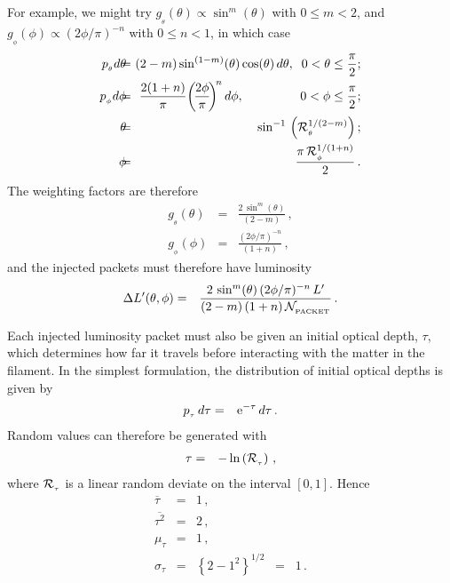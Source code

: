 \documentclass[usenatbib]{mn2e}
\numberwithin{equation}{section}
\begin{document}
For example, we might try $g_{_\theta}(\theta)\!\propto\!\sin^m(\theta)$ with $0\!\leq\!m\!<\!2$, and $g_{_\phi}(\phi)\!\propto\!(2\phi /\pi)^{-n}$ with $0\!\leq\!n\!<\!1$, in which case
\begin{eqnarray}
p_{_\theta}d\theta\!\!&\!\!=\!\!&\!\!(2-m)\sin^{(1-m)}(\theta)\cos(\theta)\,d\theta,\;\;0<\theta\leq\frac{\pi}{2};\\
p_{_\phi}d\phi\!\!&\!\!=\!\!&\!\!\frac{2(1+n)}{\pi}\!\left(\!\frac{2\phi}{\pi}\!\right)^{\!n}d\phi,\hspace{1.60cm}0<\phi\leq\frac{\pi}{2};\\
\theta\!\!&\!\!=\!\!&\!\!\sin^{-1}\,\left({\cal R}_{_\theta}^{1/(2-m)}\right);\\
\phi\!\!&\!\!=\!\!&\!\!\frac{\pi\,{\cal R}_{_\phi}^{1/(1+n)}}{2}\,.
\end{eqnarray}
The weighting factors are therefore
\begin{eqnarray}
g_{_\theta}(\theta)&=&\frac{2\,\sin^m(\theta)}{(2-m)}\,,\\
g_{_\phi}(\phi)&=&\frac{(2\phi /\pi)^{-n}}{(1+n)}\,,
\end{eqnarray}
and the injected packets must therefore have luminosity
\begin{eqnarray}
\Delta L'(\theta,\phi)&=&\frac{2\,\sin^m(\theta)\,(2\phi /\pi)^{-n}\,L'}{(2-m)\,(1+n)\,{\cal N}_{_{\rm PACKET}}}\,.
\end{eqnarray}

Each injected luminosity packet must also be given an initial optical depth, $\tau$, which determines how far it travels before interacting with the matter in the filament. In the simplest formulation, the distribution of initial optical depths is given by
\begin{eqnarray}
p_{_\tau}\,d\tau&=&{\rm e}^{-\tau}\,d\tau\,.
\end{eqnarray}
Random values can therefore be generated with
\begin{eqnarray}
\tau&=&-\ln\left({\cal R}_{_\tau}\right)\,,
\end{eqnarray}
where ${\cal R}_{_\tau}$ is a linear random deviate on the interval $[0,1]$. Hence
\begin{eqnarray}\nonumber
\overline{\tau}&=&1\,,\\\nonumber
\overline{\tau^2}&=&2\,,\\
\mu_\tau&=&1\,,\\
\sigma_\tau&=&\left\{2-1^2\right\}^{1/2}\;\;=\;\;1\,.
\end{eqnarray}
\end{document}
